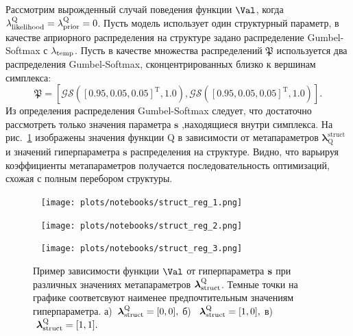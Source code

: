 \begin{example} 
Рассмотрим вырожденный случай поведения функции $\Val$, когда $\lambda_\text{likelihood}^\text{Q} = \lambda_\text{prior}^\text{Q} = 0$. Пусть модель использует один структурный параметр, в качестве априорного распределения на структуре задано распределение Gumbel-Softmax с $\lambda_{\text{temp}}$. Пусть в качестве множества распределений $\mathfrak{P}$ используется два распределения Gumbel-Softmax, сконцентрированных близко к вершинам симплекса:
\[
    \mathfrak{P} = [\mathcal{GS}([0.95, 0.05, 0.05]^\text{T}, 1.0) ,\mathcal{GS}([0.95, 0.05, 0.05]^{\text{T}}, 1.0)].
\]
Из определения распределения Gumbel-Softmax следует, что достаточно рассмотреть только значения параметра $\mathbf{s}$ ,находящиеся внутри симплекса.
На рис.~\ref{fig:gs_comb} изображены значения функции Q в зависимости от метапараметров $\boldsymbol{\lambda}^\text{struct}_\text{Q}$ и значений гиперпараметра $\mathbf{s}$ распределения на структуре. Видно, что варьируя  коэффициенты метапараметров получается последовательность оптимизаций, схожая с полным перебором структуры.
\end{example}


\begin{figure}
 \begin{minipage}[t]{.32\textwidth}
   \texttt{[image: plots/notebooks/struct\_reg\_1.png]}
\subcaption{}
\end{minipage}
\hfill
 \begin{minipage}[t]{.32\textwidth}
   \texttt{[image: plots/notebooks/struct\_reg\_2.png]}
\subcaption{}
\end{minipage}
\hfill
 \begin{minipage}[t]{.32\textwidth}
   \texttt{[image: plots/notebooks/struct\_reg\_3.png]}
\subcaption{}
\end{minipage}

\caption{Пример зависимости функции $\Val$ от гиперпараметра $\mathbf{s}$ при различных значениях метапараметров $\boldsymbol{\lambda}_\text{struct}^\text{Q}$. Темные точки на графике соответсвуют наименее предпочтительным значениям гиперпараметра. а)~$\boldsymbol{\lambda}_\text{struct}^\text{Q} = [0,0],$ б)~$~\boldsymbol{\lambda}_\text{struct}^\text{Q} = [1,0],$ в)~$~\boldsymbol{\lambda}_\text{struct}^\text{Q} = [1,1].$}
\label{fig:gs_comb}

\end{figure}


